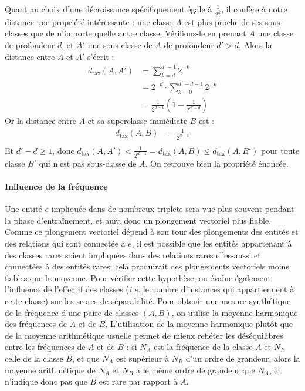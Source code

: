 Quant au choix d'une décroissance spécifiquement égale à $\frac{1}{2^k}$, il confère à notre distance une propriété intéressante : une classe $A$ est plus proche de ses sous-classes que de n'importe quelle autre classe. Vérifions-le en prenant $A$ une classe de profondeur $d$, et $A'$ une sous-classe de $A$ de profondeur $d' > d$. Alors la distance entre $A$ et $A'$ s'écrit :
\begin{align*}
    d_\text{tax}(A, A') &= \sum_{k = d}^{d'-1} 2^{-k} \\
    &= 2^{-d} \cdot \sum_{k=0}^{d'-d-1} 2^{-k} \\
    &= \frac{1}{2^{d-1}} \left(1 - \frac{1}{2^{d'-d}} \right) 
\end{align*}
Or la distance entre $A$ et sa superclasse immédiate $B$ est :
\begin{align*}
    d_\text{tax}(A, B) &= \frac{1}{2^{d-1}} \\
\end{align*}
Et $d'-d \geq 1$, donc $d_\text{tax}(A, A') < \frac{1}{2^{d-1}} = d_\text{tax}(A, B) \leq d_\text{tax}(A, B')$ pour toute classe $B'$ qui n'est pas sous-classe de $A$. On retrouve bien la propriété énoncée.

\paragraph{Influence de la fréquence}

Une entité $e$ impliquée dans de nombreux triplets sera vue plus souvent pendant la phase d'entraînement, et aura donc un plongement vectoriel plus fiable. Comme ce plongement vectoriel dépend à son tour des plongements des entités et des relations qui sont connectée à $e$, il est possible que les entités appartenant à des classes rares soient impliquées dans des relations rares elles-aussi et connectées à des entités rares; cela produirait des plongements vectoriels moins fiables que la moyenne. Pour vérifier cette hypothèse, on évalue également l'influence de l'effectif des classes (\textit{i.e.} le nombre d'instances qui appartiennent à cette classe) sur les scores de séparabilité. Pour obtenir une mesure synthétique de la fréquence d'une paire de classes $(A, B)$, on utilise la moyenne harmonique des fréquences de $A$ et de $B$. L'utilisation de la moyenne harmonique plutôt que de la moyenne arithmétique usuelle permet de mieux refléter les déséquilibres entre les fréquences de $A$ et de $B$ : si $N_A$ est la fréquence de la classe $A$ et $N_B$ celle de la classe $B$, et que $N_A$ est supérieur à $N_B$ d'un ordre de grandeur, alors la moyenne arithmétique de $N_A$ et $N_B$ a le même ordre de grandeur que $N_A$, et n'indique donc pas que $B$ est rare par rapport à $A$.

